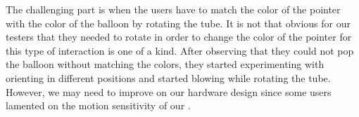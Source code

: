 The challenging part is when the users have to match the color of the pointer with the color of the balloon by rotating the tube. It is not that obvious for our testers that they needed to rotate \tube in order to change the color of the pointer for this type of interaction is one of a kind. After observing that they could not pop the balloon without matching the colors, they started experimenting with orienting \tube in different positions and started blowing while rotating the tube. However, we may need to improve on our hardware design since some users lamented on the motion sensitivity of our \tube.

